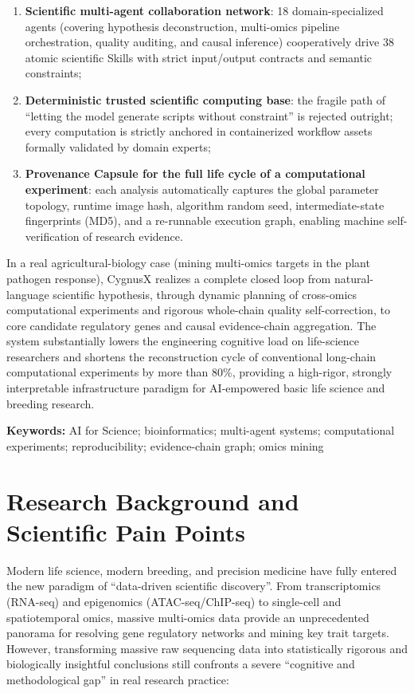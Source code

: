 \documentclass[11pt,a4paper]{article}
\begin{document}
\begin{enumerate}
  \item \textbf{Scientific multi-agent collaboration network}: 18 domain-specialized agents (covering hypothesis deconstruction, multi-omics pipeline orchestration, quality auditing, and causal inference) cooperatively drive 38 atomic scientific Skills with strict input/output contracts and semantic constraints;
  \item \textbf{Deterministic trusted scientific computing base}: the fragile path of ``letting the model generate scripts without constraint'' is rejected outright; every computation is strictly anchored in containerized workflow assets formally validated by domain experts;
  \item \textbf{Provenance Capsule for the full life cycle of a computational experiment}: each analysis automatically captures the global parameter topology, runtime image hash, algorithm random seed, intermediate-state fingerprints (MD5), and a re-runnable execution graph, enabling machine self-verification of research evidence.
\end{enumerate}

In a real agricultural-biology case (mining multi-omics targets in the plant pathogen response), CygnusX realizes a complete closed loop from natural-language scientific hypothesis, through dynamic planning of cross-omics computational experiments and rigorous whole-chain quality self-correction, to core candidate regulatory genes and causal evidence-chain aggregation. The system substantially lowers the engineering cognitive load on life-science researchers and shortens the reconstruction cycle of conventional long-chain computational experiments by more than 80\%, providing a high-rigor, strongly interpretable infrastructure paradigm for AI-empowered basic life science and breeding research.

\textbf{Keywords:} AI for Science; bioinformatics; multi-agent systems; computational experiments; reproducibility; evidence-chain graph; omics mining

\section{Research Background and Scientific Pain Points}

Modern life science, modern breeding, and precision medicine have fully entered the new paradigm of ``data-driven scientific discovery''. From transcriptomics (RNA-seq) and epigenomics (ATAC-seq/ChIP-seq) to single-cell and spatiotemporal omics, massive multi-omics data provide an unprecedented panorama for resolving gene regulatory networks and mining key trait targets. However, transforming massive raw sequencing data into statistically rigorous and biologically insightful conclusions still confronts a severe ``cognitive and methodological gap'' in real research practice:
\end{document}
